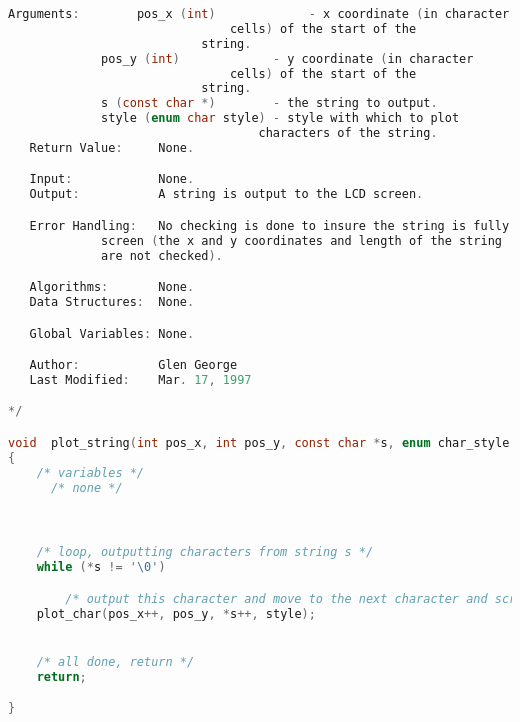 \begin{lstlisting}[language=C]
   Arguments:        pos_x (int)             - x coordinate (in character
   				               cells) of the start of the
					       string.
		     pos_y (int)             - y coordinate (in character
   				               cells) of the start of the
					       string.
		     s (const char *)        - the string to output.
		     style (enum char style) - style with which to plot
		     		               characters of the string.
   Return Value:     None.

   Input:            None.
   Output:           A string is output to the LCD screen.

   Error Handling:   No checking is done to insure the string is fully on the
   		     screen (the x and y coordinates and length of the string
		     are not checked).

   Algorithms:       None.
   Data Structures:  None.

   Global Variables: None.

   Author:           Glen George
   Last Modified:    Mar. 17, 1997

*/

void  plot_string(int pos_x, int pos_y, const char *s, enum char_style style)
{
    /* variables */
      /* none */



    /* loop, outputting characters from string s */
    while (*s != '\0')

        /* output this character and move to the next character and screen position */
	plot_char(pos_x++, pos_y, *s++, style);


    /* all done, return */
    return;

}
\end{lstlisting}

